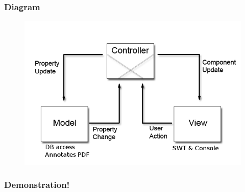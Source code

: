 \documentclass[t,12pt]{beamer}
\begin{document}
\begin{frame}
  \frametitle{Diagram}
  \begin{figure}[!ht]
    \vfill
    \centering
    \includegraphics[scale=.5]{diagram.png}
  \end{figure}
\end{frame}

\begin{frame}
  \frametitle{Demonstration!}
\end{frame}
\end{document}
